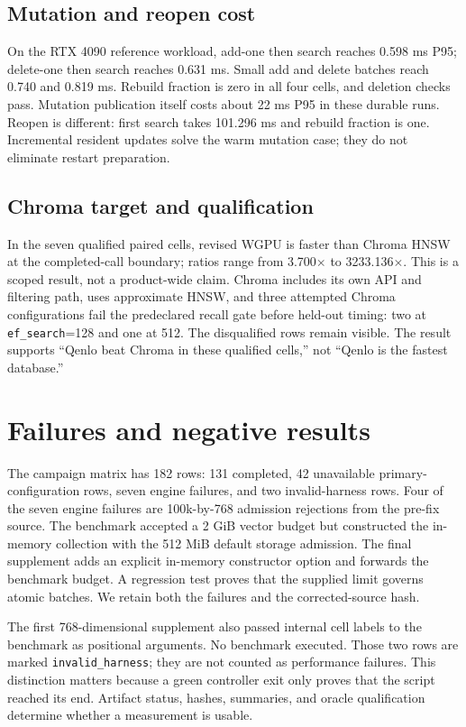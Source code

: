 \documentclass[10pt]{article}
\begin{document}
\subsection{Mutation and reopen cost}
On the RTX 4090 reference workload, add-one then search reaches 0.598 ms P95; delete-one then search reaches 0.631 ms. Small add and delete batches reach 0.740 and 0.819 ms. Rebuild fraction is zero in all four cells, and deletion checks pass. Mutation publication itself costs about 22 ms P95 in these durable runs. Reopen is different: first search takes 101.296 ms and rebuild fraction is one. Incremental resident updates solve the warm mutation case; they do not eliminate restart preparation.

\subsection{Chroma target and qualification}
In the seven qualified paired cells, revised WGPU is faster than Chroma HNSW at the completed-call boundary; ratios range from 3.700$\times$ to 3233.136$\times$. This is a scoped result, not a product-wide claim. Chroma includes its own API and filtering path, uses approximate HNSW, and three attempted Chroma configurations fail the predeclared recall gate before held-out timing: two at \texttt{ef\_search}=128 and one at 512. The disqualified rows remain visible. The result supports ``Qenlo beat Chroma in these qualified cells,'' not ``Qenlo is the fastest database.''

\section{Failures and negative results}
The campaign matrix has 182 rows: 131 completed, 42 unavailable primary-configuration rows, seven engine failures, and two invalid-harness rows. Four of the seven engine failures are 100k-by-768 admission rejections from the pre-fix source. The benchmark accepted a 2 GiB vector budget but constructed the in-memory collection with the 512 MiB default storage admission. The final supplement adds an explicit in-memory constructor option and forwards the benchmark budget. A regression test proves that the supplied limit governs atomic batches. We retain both the failures and the corrected-source hash.

The first 768-dimensional supplement also passed internal cell labels to the benchmark as positional arguments. No benchmark executed. Those two rows are marked \texttt{invalid\_harness}; they are not counted as performance failures. This distinction matters because a green controller exit only proves that the script reached its end. Artifact status, hashes, summaries, and oracle qualification determine whether a measurement is usable.
\end{document}

